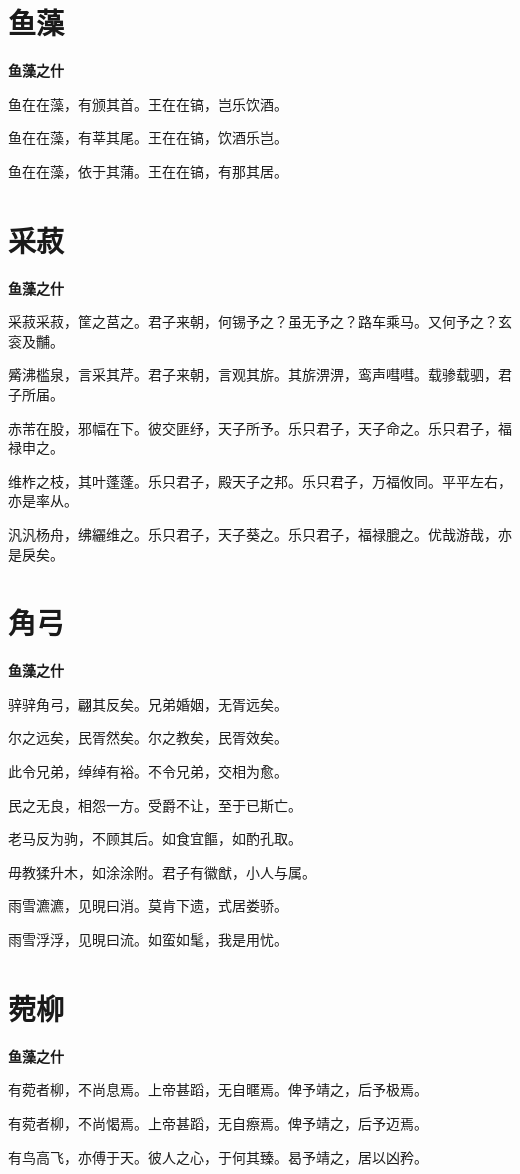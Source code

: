 \documentclass[12pt,a4paper]{ctexbook}
\begin{document}
\section{鱼藻}
\textbf{鱼藻之什}\par\vspace{0.5em}
鱼在在藻，有颁其首。王在在镐，岂乐饮酒。\par
鱼在在藻，有莘其尾。王在在镐，饮酒乐岂。\par
鱼在在藻，依于其蒲。王在在镐，有那其居。\par

\section{采菽}
\textbf{鱼藻之什}\par\vspace{0.5em}
采菽采菽，筐之莒之。君子来朝，何锡予之？虽无予之？路车乘马。又何予之？玄衮及黼。\par
觱沸槛泉，言采其芹。君子来朝，言观其旂。其旂淠淠，鸾声嘒嘒。载骖载驷，君子所届。\par
赤芾在股，邪幅在下。彼交匪纾，天子所予。乐只君子，天子命之。乐只君子，福禄申之。\par
维柞之枝，其叶蓬蓬。乐只君子，殿天子之邦。乐只君子，万福攸同。平平左右，亦是率从。\par
汎汎杨舟，绋纚维之。乐只君子，天子葵之。乐只君子，福禄膍之。优哉游哉，亦是戾矣。\par

\section{角弓}
\textbf{鱼藻之什}\par\vspace{0.5em}
骍骍角弓，翩其反矣。兄弟婚姻，无胥远矣。\par
尔之远矣，民胥然矣。尔之教矣，民胥效矣。\par
此令兄弟，绰绰有裕。不令兄弟，交相为愈。\par
民之无良，相怨一方。受爵不让，至于已斯亡。\par
老马反为驹，不顾其后。如食宜饇，如酌孔取。\par
毋教猱升木，如涂涂附。君子有徽猷，小人与属。\par
雨雪瀌瀌，见晛曰消。莫肯下遗，式居娄骄。\par
雨雪浮浮，见晛曰流。如蛮如髦，我是用忧。\par

\section{菀柳}
\textbf{鱼藻之什}\par\vspace{0.5em}
有菀者柳，不尚息焉。上帝甚蹈，无自暱焉。俾予靖之，后予极焉。\par
有菀者柳，不尚愒焉。上帝甚蹈，无自瘵焉。俾予靖之，后予迈焉。\par
有鸟高飞，亦傅于天。彼人之心，于何其臻。曷予靖之，居以凶矜。\par
\end{document}
